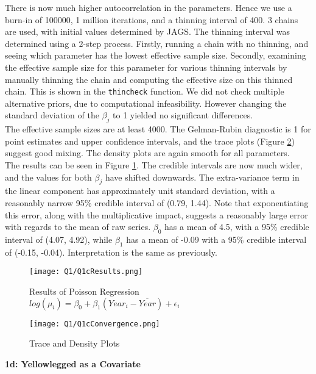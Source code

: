 \documentclass[11pt]{article}
\begin{document}
There is now much higher autocorrelation in the parameters. Hence we use a burn-in of 100000, 1 million iterations, and a thinning interval of 400. 3 chains are used, with initial values determined by JAGS. The thinning interval was determined using a 2-step process. Firstly, running a chain with no thinning, and seeing which parameter has the lowest effective sample size. Secondly, examining the effective sample size for this parameter for various thinning intervals by manually thinning the chain and computing the effective size on this thinned chain. This is shown in the \texttt{thincheck} function. We did not check multiple alternative priors, due to computational infeasibility. However changing the standard deviation of the $\beta_j$ to 1 yielded no significant differences. \\
The effective sample sizes are at least 4000. The Gelman-Rubin diagnostic is 1 for point estimates and upper confidence intervals, and the trace plots (Figure \ref{Fig::1cTrace}) suggest good mixing. The density plots are again smooth for all parameters. \\ 
The results can be seen in Figure \ref{Fig::1cRes}. The credible intervals are now much wider, and the values for both $\beta_j$ have shifted downwards. The extra-variance term in the linear component has approximately unit standard deviation, with a reasonably narrow 95\% credible interval of (0.79, 1.44). Note that exponentiating this error, along with the multiplicative impact, suggests a reasonably large error with regards to the mean of raw series. $\beta_0$ has a mean of 4.5, with a 95\% credible interval of (4.07, 4.92), while $\beta_1$ has a mean of -0.09 with a 95\% credible interval of (-0.15, -0.04). Interpretation is the same as previously. 

\begin{figure}[!h]
\centering
\texttt{[image: Q1/Q1cResults.png]}
\caption{Results of Poisson Regression $log(\mu_i) = \beta_0 + \beta_1(Year_i - \overline{Year}) + \epsilon_i$} \label{Fig::1cRes}
\end{figure}


\begin{figure}[!h]
\centering
\texttt{[image: Q1/Q1cConvergence.png]}
\caption{Trace and Density Plots} \label{Fig::1cTrace}
\end{figure}




\newpage
\textbf{1d: Yellowlegged as a Covariate} \label{sec::1d}
\end{document}
